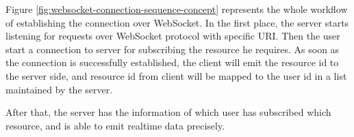 
Figure \ref{fig:websocket-connection-sequence-concept} represents the whole workflow of establishing the connection over WebSocket. In the first place, the server starts listening for requests over WebSocket protocol with specific URI. Then the user start a connection to server for subscribing the resource he requires. As soon as the connection is successfully established, the client will emit the resource id to the server side, and resource id from client will be mapped to the user id in a list maintained by the server.

After that, the server has the information of which user has subscribed which resource, and is able to emit realtime data precisely.